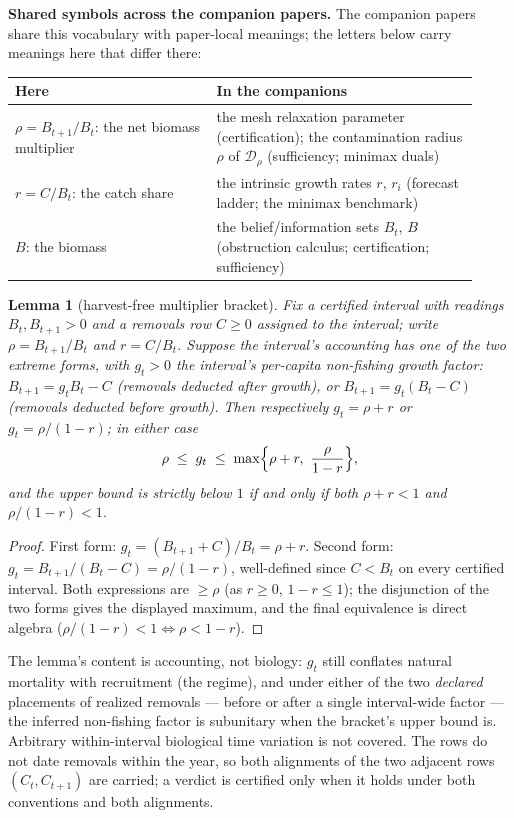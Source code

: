\documentclass[10pt,twocolumn]{article}
\theoremstyle{plain}
\newtheorem{lemma}[theorem]{Lemma}
\theoremstyle{remark}
\begin{document}
\medskip
\noindent\textbf{Shared symbols across the companion papers.} The
companion papers share this vocabulary with paper-local meanings; the
letters below carry meanings here that differ there:
\begin{center}\small
\begin{tabular}{@{}p{0.40\linewidth}p{0.52\linewidth}@{}}
\toprule
\textbf{Here} & \textbf{In the companions} \\
\midrule
\(\rho = B_{t+1}/B_t\): the net biomass multiplier &
the mesh relaxation parameter (certification); the contamination radius
\(\rho\) of \(\mathcal{D}_{\rho}\) (sufficiency; minimax duals) \\
\(r = C/B_t\): the catch share &
the intrinsic growth rates \(r\), \(r_{i}\) (forecast ladder; the
minimax benchmark) \\
\(B\): the biomass &
the belief/information sets \(B_t\), \(B\) (obstruction calculus;
certification; sufficiency) \\
\bottomrule
\end{tabular}
\end{center}

\begin{lemma}[harvest-free multiplier bracket]\label{lem:bracket}
Fix a certified interval with readings \(B_t, B_{t+1} > 0\) and a
removals row \(C \ge 0\) assigned to the interval; write
\(\rho = B_{t+1}/B_t\) and \(r = C/B_t\). Suppose the interval's
accounting has one of the two extreme forms, with \(g_t > 0\) the
interval's per-capita non-fishing growth factor:
\(B_{t+1} = g_t B_t - C\) (removals deducted after growth), or
\(B_{t+1} = g_t (B_t - C)\) (removals deducted before growth). Then
respectively \(g_t = \rho + r\) or \(g_t = \rho/(1-r)\); in either
case
\[
\rho \;\le\; g_t \;\le\; \max\Bigl\{\rho + r,\ \frac{\rho}{1-r}\Bigr\},
\]
and the upper bound is strictly below \(1\) if and only if both
\(\rho + r < 1\) and \(\rho/(1-r) < 1\).
\end{lemma}

\begin{proof}
First form: \(g_t = (B_{t+1} + C)/B_t = \rho + r\). Second form:
\(g_t = B_{t+1}/(B_t - C) = \rho/(1 - r)\), well-defined since
\(C < B_t\) on every certified interval. Both expressions are
\(\ge \rho\) (as \(r \ge 0\), \(1 - r \le 1\)); the disjunction of the
two forms gives the displayed maximum, and the final equivalence is
direct algebra (\(\rho/(1-r) < 1 \iff \rho < 1 - r\)).
\end{proof}

The lemma's content is accounting, not biology: \(g_t\) still conflates
natural mortality with recruitment (the regime), and under either of the two \emph{declared} placements of realized
removals --- before or after a single interval-wide factor --- the
inferred non-fishing factor is subunitary when the bracket's upper bound is.
Arbitrary within-interval biological time variation is not covered. The rows do not date removals
within the year, so both alignments of the two adjacent rows
\((C_t, C_{t+1})\) are carried; a verdict is certified only when it
holds under both conventions and both alignments.
\end{document}
